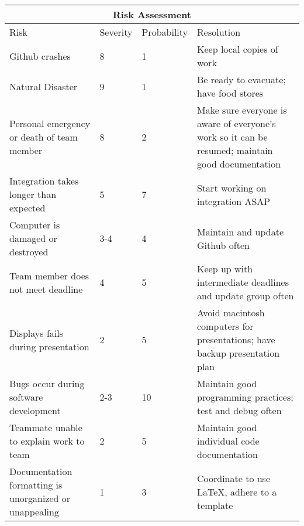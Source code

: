 \documentclass{scrreprt}
\begin{document}
\begin{tabular}{ |p{4cm}||p{2cm}|p{2cm}|p{4cm}|  }
    \hline
    \multicolumn{4}{|c|}{Risk Assessment} \\
    \hline
    Risk & Severity & Probability & Resolution\\
    \hline
    \hline
    Github crashes & 8 & 1 & Keep local copies of work\\
    \hline
    Natural Disaster & 9 & 1 & Be ready to evacuate; have food stores\\
    \hline
    Personal emergency or death of team member & 8 & 2 & Make sure everyone is aware of everyone's work so it can be resumed; maintain good documentation\\
    \hline
    Integration takes longer than expected & 5 & 7 & Start working on integration ASAP\\
    \hline
    Computer is damaged or destroyed & 3-4 & 4 & Maintain and update Github often\\
    \hline
    Team member does not meet deadline & 4 & 5 & Keep up with intermediate deadlines and update group often\\
    \hline
    Displays fails during presentation & 2 & 5 & Avoid macintosh computers for presentations; have backup presentation plan\\
    \hline
    Bugs occur during software development & 2-3 & 10 & Maintain good programming practices; test and debug often\\
    \hline
    Teammate unable to explain work to team & 2 & 5 & Maintain good individual code documentation\\
    \hline
    Documentation formatting is unorganized or unappealing & 1 & 3 & Coordinate to use LaTeX, adhere to a template\\
    \hline
\end{tabular}
\end{document}
